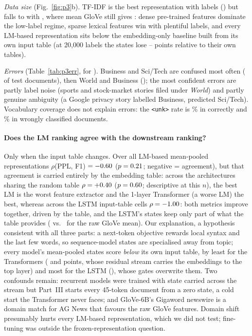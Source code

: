 \documentclass[10pt,a4paper]{article}
\begin{document}
\emph{Data size} (Fig.~\ref{fig:p3}b). TF-IDF is the best representation with \nLabelsFull{} labels (\fOneTfidf) but falls to \fOneSmallTfidf{} with \nLabelsSmall, where mean GloVe still gives \fOneSmallEmbGloveMean: dense pre-trained features dominate the low-label regime, sparse lexical features win with plentiful labels, and every LM-based representation sits below the embedding-only baseline built from its own input table \ownTableSizes{} (at 20,000 labels the states lose \ownLossTransformerOnelRandMean{}--\ownLossLstmRandMean{} points relative to their own tables).

\emph{Errors} (Table~\ref{tab:p3err}, for \confusionRep). Business and Sci/Tech are confused most often (\confBusinessSciTech{} of \nTestDocs{} test documents), then World and Business (\confWorldBusiness); the most confident errors are partly label noise (sports and stock-market stories filed under \emph{World}) and partly genuine ambiguity (a Google privacy story labelled Business, predicted Sci/Tech). Vocabulary coverage does not explain errors: the \texttt{<unk>} rate is \unkRateCorrect\% in correctly and \unkRateWrong\% in wrongly classified documents.

\paragraph{Does the LM ranking agree with the downstream ranking?}
Only when the input table changes. Over all \spearmanN{} LM-based mean-pooled representations $\rho$(PPL, F1) $=-0.60$ ($p=0.21$; negative = agreement), but that agreement is carried entirely by the embedding table: across the \spearmanNArch{} architectures sharing the random table $\rho=+0.40$ ($p=0.60$; descriptive at this $n$), the best LM is the worst feature extractor and the 1-layer Transformer (a worse LM) the best, whereas across the \spearmanNCells{} LSTM input-table cells $\rho=-1.00$: both metrics improve together, driven by the table, and the LSTM's states keep only part of what the table provides (\fOneLstmGloveFrozenMean{} vs.\ \fOneEmbGloveMean{} for the raw GloVe mean). Our explanation, a hypothesis consistent with all three parts: a next-token objective rewards local syntax and the last few words, so sequence-model states are specialised away from topic; every model's mean-pooled states score \emph{below} its own input table, by least for the Transformers (\ownLossTransformerOnelRandMean{} and \ownLossTransformerRandMean{} points, whose residual stream carries the embeddings to the top layer) and most for the LSTM (\ownLossLstmRandMean), whose gates overwrite them. Two confounds remain: recurrent models were trained with state carried across the stream but Part~III starts every 45-token document from a zero state, a cold start the Transformer never faces; and GloVe-6B's Gigaword newswire is a domain match for AG News that favours the raw GloVe features. Domain shift presumably hurts every LM-based representation, which we did not test; fine-tuning was outside the frozen-representation question.
\end{document}

